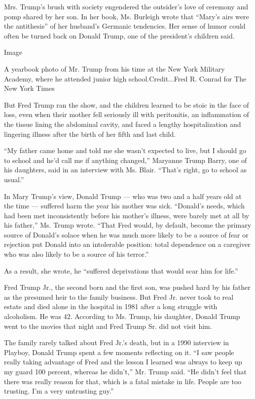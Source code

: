 Mrs. Trump's brush with society engendered the outsider's love of
ceremony and pomp shared by her son. In her book, Ms. Burleigh wrote
that ``Mary's airs were the antithesis'' of her husband's Germanic
tendencies. Her sense of humor could often be turned back on Donald
Trump, one of the president's children said.

Image

A yearbook photo of Mr. Trump from his time at the New York Military
Academy, where he attended junior high school.Credit...Fred R. Conrad
for The New York Times

But Fred Trump ran the show, and the children learned to be stoic in the
face of loss, even when their mother fell seriously ill with
peritonitis, an inflammation of the tissue lining the abdominal cavity,
and faced a lengthy hospitalization and lingering illness after the
birth of her fifth and last child.

``My father came home and told me she wasn't expected to live, but I
should go to school and he'd call me if anything changed,'' Maryanne
Trump Barry, one of his daughters, said in an interview with Ms. Blair.
``That's right, go to school as usual.''

In Mary Trump's view, Donald Trump --- who was two and a half years old
at the time --- suffered harm the year his mother was sick. ``Donald's
needs, which had been met inconsistently before his mother's illness,
were barely met at all by his father,'' Ms. Trump wrote. ``That Fred
would, by default, become the primary source of Donald's solace when he
was much more likely to be a source of fear or rejection put Donald into
an intolerable position: total dependence on a caregiver who was also
likely to be a source of his terror.''

As a result, she wrote, he ``suffered deprivations that would scar him
for life.''

Fred Trump Jr., the second born and the first son, was pushed hard by
his father as the presumed heir to the family business. But Fred Jr.
never took to real estate and died alone in the hospital in 1981 after a
long struggle with alcoholism. He was 42. According to Ms. Trump, his
daughter, Donald Trump went to the movies that night and Fred Trump Sr.
did not visit him.

The family rarely talked about Fred Jr.'s death, but in a 1990 interview
in Playboy, Donald Trump spent a few moments reflecting on it. ``I saw
people really taking advantage of Fred and the lesson I learned was
always to keep up my guard 100 percent, whereas he didn't,'' Mr. Trump
said. ``He didn't feel that there was really reason for that, which is a
fatal mistake in life. People are too trusting. I'm a very untrusting
guy.''

